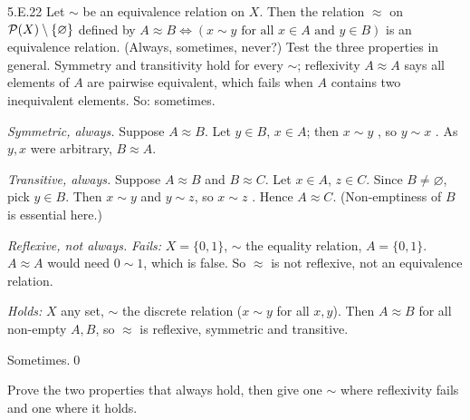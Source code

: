 \begin{bookex}[essential]{5.E.22}
Let $\sim$ be an equivalence relation on $X$. Then the relation $\approx$ on $\mathcal{P}(X)\setminus\{\varnothing\}$ defined by $A\approx B\Leftrightarrow(x\sim y\text{ for all }x\in A\text{ and }y\in B)$ is an equivalence relation. (Always, sometimes, never?)
\solution
\plan Test the three properties in general. Symmetry and transitivity hold for every $\sim$; reflexivity $A\approx A$ says all elements of $A$ are pairwise equivalent, which fails when $A$ contains two inequivalent elements. So: sometimes.
\begin{steps}
\item \emph{Symmetric, always.} Suppose $A\approx B$. Let $y\in B$, $x\in A$; then $x\sim y$ , so $y\sim x$ . As $y,x$ were arbitrary, $B\approx A$.
\item \emph{Transitive, always.} Suppose $A\approx B$ and $B\approx C$. Let $x\in A$, $z\in C$. Since $B\ne\varnothing$, pick $y\in B$. Then $x\sim y$ and $y\sim z$, so $x\sim z$ . Hence $A\approx C$. (Non-emptiness of $B$ is essential here.)
\item \emph{Reflexive, not always.} \emph{Fails:} $X=\{0,1\}$, $\sim$ the equality relation, $A=\{0,1\}$. $A\approx A$ would need $0\sim1$, which is false. So $\approx$ is not reflexive, not an equivalence relation.
\item \emph{Holds:} $X$ any set, $\sim$ the discrete relation ($x\sim y$ for all $x,y$). Then $A\approx B$ for all non-empty $A,B$, so $\approx$ is reflexive, symmetric and transitive.
\end{steps}
\conclusion Sometimes.\qed
\begin{compare}
\item Prove the two properties that always hold, then give one $\sim$ where reflexivity fails and one where it holds.
\end{compare}
\end{bookex}

